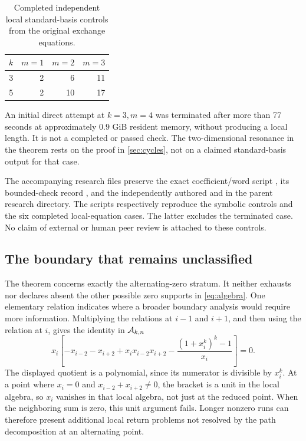 \begin{table}[htbp]
\centering
\caption{Completed independent local standard-basis controls from the
original exchange equations.}\label{tab:direct}
\begin{tabular}{rrrr}
\toprule
$k$ & $m=1$ & $m=2$ & $m=3$\\
\midrule
3 & 2 & 6 & 11\\
5 & 2 & 10 & 17\\
\bottomrule
\end{tabular}
\end{table}

An initial direct attempt at $k=3,m=4$ was terminated after more than
77 seconds at approximately $0.9$ GiB resident memory, without producing
a local length. It is not a completed or passed check. The two-dimensional
resonance in the theorem rests on the proof in \cref{sec:cycles}, not on
a claimed standard-basis output for that case.

The accompanying research files preserve the exact coefficient/word
script , its bounded-check
record , and the independently authored
 and
 in the parent research directory.
The scripts respectively reproduce the symbolic controls and the six
completed local-equation cases. The latter excludes the terminated case.
No claim of external or human peer review is attached to these controls.

\subsection{The boundary that remains unclassified}

The theorem concerns exactly the alternating-zero stratum. It neither
exhausts nor declares absent the other possible zero supports in
\eqref{eq:algebra}. One elementary relation indicates where a broader
boundary analysis would require more information. Multiplying the
relations at $i-1$ and $i+1$, and then using the relation at $i$, gives
the identity in $\mathcal A_{k,n}$
\begin{equation}\label{eq:boundaryidentity}
 x_i\!\left[
 -x_{i-2}-x_{i+2}+x_ix_{i-2}x_{i+2}
 -\frac{(1+x_i^k)^k-1}{x_i}
 \right]=0.
\end{equation}
The displayed quotient is a polynomial, since its numerator is divisible
by $x_i^k$. At a point where $x_i=0$ and $x_{i-2}+x_{i+2}\ne0$, the
bracket is a unit in the local algebra, so $x_i$ vanishes in that local
algebra, not just at the reduced point. When the neighboring sum is zero,
this unit argument fails. Longer nonzero runs can therefore present
additional local return problems not resolved by the path decomposition
at an alternating point.


